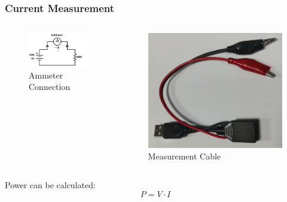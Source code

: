 \begin{frame}
  \frametitle{Current Measurement}
  \vspace*{-2mm}
  \begin{columns}
    \begin{figure}
      \centering
      \includegraphics[scale=0.8]{images/ammeter.pdf}
      \caption{Ammeter Connection}
    \end{figure}
    \begin{figure}
      \centering
      \includegraphics[scale=0.07]{images/current-cable.jpg}
      \caption{Measurement Cable}
    \end{figure}
  \end{columns}

  Power can be calculated:
  \[ P = V \cdot I \]
\end{frame}

